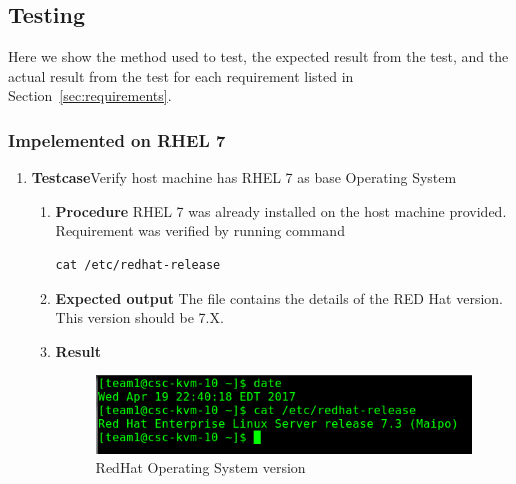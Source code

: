 \subsection{Testing}
\renewcommand{\thesubsubsection}{\textbf{FR-\arabic{subsubsection}}}
\label{sec:testing}



Here we show the method used to test, the expected
result from the test, and the actual result from the test for each
requirement listed in Section~\ref{sec:requirements}. %
\subsubsection{Impelemented on RHEL 7}
\begin{enumerate}
\item \textbf{Testcase}\newline Verify host machine has RHEL 7 as base Operating System
  \begin{enumerate}[label={}]
  \item \textbf{Procedure}\newline
    RHEL 7 was already installed on the host machine
    provided. Requirement was verified by running command
    \begin{lstlisting}[style=Bash]
      cat /etc/redhat-release
    \end{lstlisting}
  \item \textbf{Expected output}\newline
    The  file contains the details of the
    RED Hat version. This version should be 7.X.
  \item \textbf{Result}\newline
    \begin{figure}
      \centering
      \includegraphics[scale=0.4]{screenshots/rhel7.png}
      \caption{RedHat Operating System version}
      \label{rhel7}
    \end{figure}
  \end{enumerate}
\end{enumerate}



